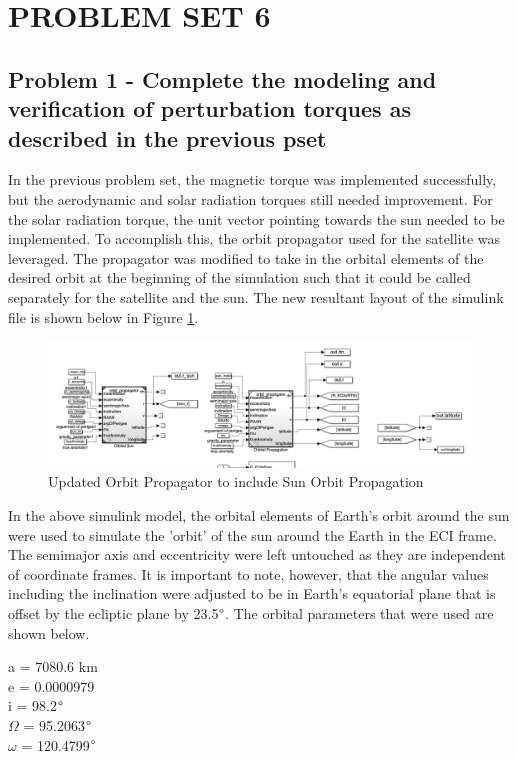 \section{\Large PROBLEM SET 6}

\subsection{Problem 1 - Complete the modeling and verification of perturbation torques as described in the previous pset} \label{sec:pertTorques}

In the previous problem set, the magnetic torque was implemented successfully, but the aerodynamic and solar radiation torques still needed improvement. For the solar radiation torque, the unit vector pointing towards the sun needed to be implemented. To accomplish this, the orbit propagator used for the satellite was leveraged. The propagator was modified to take in the orbital elements of the desired orbit at the beginning of the simulation such that it could be called separately for the satellite and the sun. The new resultant layout of the simulink file is shown below in Figure \ref{fig:sun_orbit_sim}.

\begin{figure}[H]
    \centering
    \captionsetup{ justification = centering }
    \includegraphics[width = 12cm]{Images/PS6/updatedOrbitPropagatorSim.png}
    \caption{Updated Orbit Propagator to include Sun Orbit Propagation}
    \label{fig:sun_orbit_sim}
\end{figure}

In the above simulink model, the orbital elements of Earth's orbit around the sun were used to simulate the 'orbit' of the sun around the Earth in the ECI frame. The semimajor axis and eccentricity were left untouched as they are independent of coordinate frames. It is important to note, however, that the angular values including the inclination were adjusted to be in Earth's equatorial plane that is offset by the ecliptic plane by 23.5$\degree$. The orbital parameters that were used are shown below.

\begin{center}
    a = 7080.6 km \\
    e = 0.0000979 \\
    i = 98.2$\degree$ \\
    $\Omega$ = 95.2063$\degree$ \\
    $\omega$ = 120.4799$\degree$ \\
\end{center}

